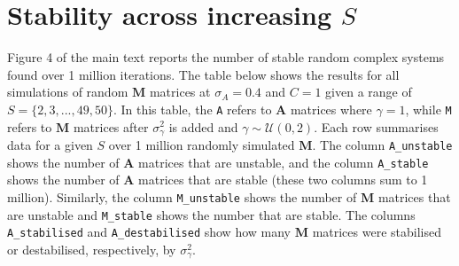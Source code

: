 \documentclass[]{article}
\begin{document}
\clearpage

\hypertarget{IncrS}{\section{\texorpdfstring{Stability across increasing
\(S\)}{Stability across increasing S}}\label{IncrS}}

Figure 4 of the main text reports the number of stable random complex
systems found over 1 million iterations. The table below shows the
results for all simulations of random \(\mathbf{M}\) matrices at
\(\sigma_{A} = 0.4\) and \(C = 1\) given a range of
\(S = \{2, 3, ..., 49, 50\}\). In this table, the \texttt{A} refers to
\(\mathbf{A}\) matrices where \(\gamma = 1\), while \texttt{M} refers to
\(\mathbf{M}\) matrices after \(\sigma^{2}_{\gamma}\) is added and
\(\gamma \sim \mathcal{U}(0, 2)\). Each row summarises data for a given
\(S\) over 1 million randomly simulated \(\mathbf{M}\). The column
\texttt{A\_unstable} shows the number of \(\mathbf{A}\) matrices that
are unstable, and the column \texttt{A\_stable} shows the number of
\(\mathbf{A}\) matrices that are stable (these two columns sum to 1
million). Similarly, the column \texttt{M\_unstable} shows the number of
\(\mathbf{M}\) matrices that are unstable and \texttt{M\_stable} shows
the number that are stable. The columns \texttt{A\_stabilised} and
\texttt{A\_destabilised} show how many \(\mathbf{M}\) matrices were
stabilised or destabilised, respectively, by \(\sigma^{2}_{\gamma}\).
\end{document}
